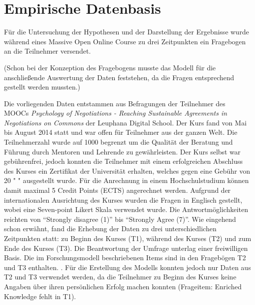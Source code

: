 \section{Empirische Datenbasis}
\label{sec:emp_daten}

Für die Untersuchung der Hypothesen und der Darstellung der Ergebnisse wurde während eines Massive Open Online Course zu drei Zeitpunkten ein Fragebogen an die Teilnehmer versendet. 

(Schon bei der Konzeption des Fragebogens musste das Modell für die anschließende Auswertung der Daten feststehen, da die Fragen entsprechend gestellt werden mussten.)

 Die vorliegenden Daten entstammen aus Befragungen der Teilnehmer des MOOCs  \textit{Psychology of Negotiations - Reaching Sustainable Agreements in Negotiations on Commons}  der Leuphana Digital School. Der Kurs fand von Mai bis August 2014 statt und war offen für Teilnehmer aus der ganzen Welt. Die Teilnehmerzahl wurde auf 1000 begrenzt um die Qualität der Beratung und Führung durch Mentoren und Lehrende zu gewährleisten. Der Kurs selbst war gebührenfrei, jedoch konnten die Teilnehmer mit einem erfolgreichen Abschluss des Kurses ein Zertifikat der Universität erhalten, welches gegen eine Gebühr von 20 \texteuro " " ausgestellt wurde. Für die Anrechnung in einem Hochschulstudium können damit maximal 5 Credit Points (ECTS) angerechnet werden. Aufgrund der internationalen Ausrichtung des Kurses wurden die Fragen in Englisch gestellt, wobei eine Seven-point Likert Skala verwendet wurde. Die Antwortmöglichkeiten reichten von "`Strongly disagree (1)"' bis "`Strongly Agree (7)"'. Wie eingehend schon erwähnt, fand die Erhebung der Daten zu drei unterschiedlichen Zeitpunkten statt: zu Beginn des Kurses (T1), während des Kurses (T2) und zum Ende des Kurses (T3). Die Beantwortung der Umfrage unterlag einer freiwilligen Basis. Die im Forschungsmodell beschriebenen Items sind in den Fragebögen T2 und T3 enthalten. .
Für die Erstellung des Modells konnten jedoch nur Daten aus T2 und T3 verwendet werden, da die Teilnehmer zu Beginn des Kurses keine Angaben über ihren persönlichen Erfolg machen konnten (Frageitem: Enriched Knowledge fehlt in T1).  
 

